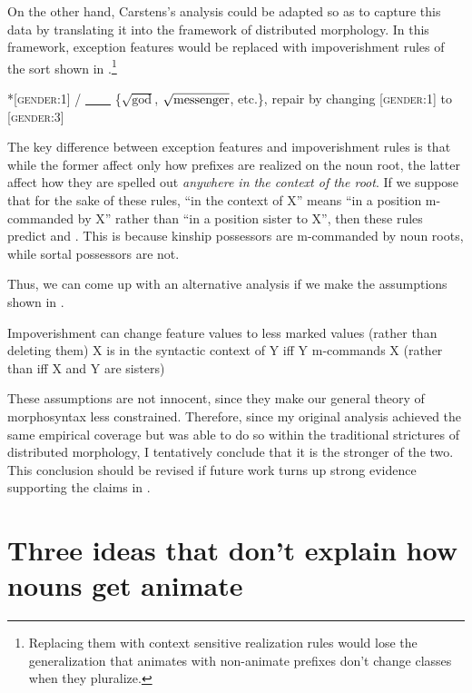 \documentclass[output=paper,newtxmath,modfonts,nonflat,hidelinks]{langsci/langscibook}
\begin{document}
On the other hand, Carstens's analysis could be adapted so as to capture this data by translating it into the framework of distributed morphology.  In this framework, exception features would be replaced with impoverishment rules of the sort shown in .\footnote{Replacing them with context sensitive realization rules would lose the generalization that animates with non-animate prefixes don't change classes when they pluralize. }

\ea\label{ex:pesetsky:impoverishment}{ 
*[\textsc{gender}:1] / 
\ul{~~~~} 
\{$\sqrt{\text{god}}$, $\sqrt{\text{messenger\vphantom{d}}}$, etc.\}, 
repair by changing [\textsc{gender}:1] to [\textsc{gender}:3]} \z

The key difference between exception features and impoverishment rules is that while the former affect only how  prefixes are realized on the noun root, the latter affect how they are spelled out \textit{anywhere in the context of the root}. If we suppose that for the sake of these rules, ``in the context of X'' means ``in a position m-commanded by X'' rather than ``in a position sister to X'', then these rules predict  and .  This is because kinship possessors are m-commanded by noun roots, while sortal possessors are not. 

Thus, we can come up with an alternative analysis if we make the assumptions shown in .

\ea\label{ex:pesetsky:deconstrainingassumptions} 
\ea Impoverishment can change feature values to less marked values (rather than deleting them)
\ex X is in the syntactic context of Y iff Y m-commands X (rather than iff X and Y are sisters) \\ \z \z

These assumptions are not innocent, since they make our general theory of morphosyntax less constrained.  Therefore, since my original analysis achieved the same empirical coverage but was able to do so within the traditional strictures of distributed morphology, I tentatively conclude that it is the stronger of the two.  This conclusion should be revised if future work turns up strong evidence supporting the claims in .




 \section{Three ideas that don't explain how nouns get animate} \label{sec:pesetsky:threeideas}
\end{document}
